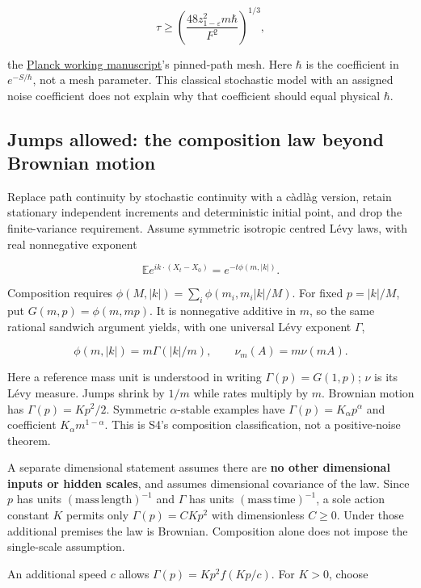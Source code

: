 \documentclass[11pt,a4paper]{article}
\begin{document}
\[\tau\ge\left(\frac{48z_{1-\varepsilon}^2m\hbar}{F^2}\right)^{1/3},\]

the \href{planck-gap-paper.md}{Planck working manuscript}'s pinned-path
mesh. Here \(\hbar\) is the coefficient in \(e^{-S/\hbar}\), not a mesh
parameter. This classical stochastic model with an assigned noise
coefficient does not explain why that coefficient should equal physical
\(\hbar\).

\hypertarget{jumps-allowed-the-composition-law-beyond-brownian-motion}{%
\subsection{Jumps allowed: the composition law beyond Brownian
motion}\label{jumps-allowed-the-composition-law-beyond-brownian-motion}}

Replace path continuity by stochastic continuity with a càdlàg version,
retain stationary independent increments and deterministic initial
point, and drop the finite-variance requirement. Assume symmetric
isotropic centred Lévy laws, with real nonnegative exponent

\[\mathbb E e^{ik\cdot(X_t-X_0)}=e^{-t\phi(m,|k|)}.\]

Composition requires \(\phi(M,|k|)=\sum_i\phi(m_i,m_i|k|/M)\). For fixed
\(p=|k|/M\), put \(G(m,p)=\phi(m,mp)\). It is nonnegative additive in
\(m\), so the same rational sandwich argument yields, with one universal
Lévy exponent \(\Gamma\),

\[\phi(m,|k|)=m\Gamma(|k|/m),\qquad \nu_m(A)=m\nu(mA).\]

Here a reference mass unit is understood in writing
\(\Gamma(p)=G(1,p)\); \(\nu\) is its Lévy measure. Jumps shrink by
\(1/m\) while rates multiply by \(m\). Brownian motion has
\(\Gamma(p)=Kp^2/2\). Symmetric \(\alpha\)-stable examples have
\(\Gamma(p)=K_\alpha p^\alpha\) and coefficient
\(K_\alpha m^{1-\alpha}\). This is S4's composition classification, not
a positive-noise theorem.

A separate dimensional statement assumes there are \textbf{no other
dimensional inputs or hidden scales}, and assumes dimensional covariance
of the law. Since \(p\) has units
\((\mathrm{mass}\,\mathrm{length})^{-1}\) and \(\Gamma\) has units
\((\mathrm{mass}\,\mathrm{time})^{-1}\), a sole action constant \(K\)
permits only \(\Gamma(p)=CKp^2\) with dimensionless \(C\ge0\). Under
those additional premises the law is Brownian. Composition alone does
not impose the single-scale assumption.

An additional speed \(c\) allows \(\Gamma(p)=Kp^2f(Kp/c)\). For \(K>0\),
choose
\end{document}
